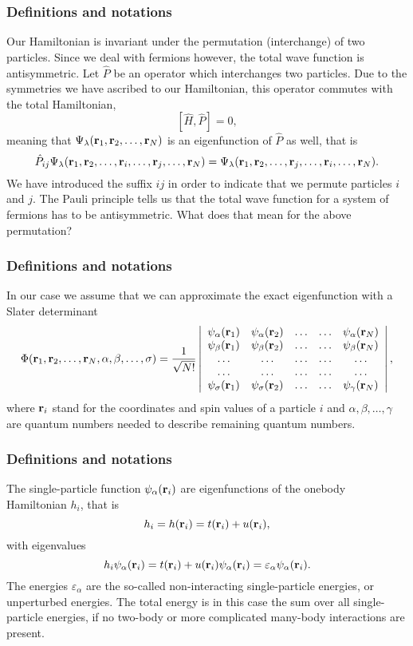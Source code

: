 \documentclass[compress]{beamer}
\newcommand{\be}{\begin{equation}}
\newcommand{\ee}{\end{equation}}
\newcommand{\be}{\begin{equation}}                        %
\newcommand{\ee}{\end{equation}}                          %
\begin{document}
\frame
{
  \frametitle{Definitions and notations}
\begin{small}
{\scriptsize
Our Hamiltonian is invariant under the permutation (interchange) of two particles. %
Since we deal with fermions however, the total wave function is antisymmetric.
Let $\hat{P}$ be an operator which interchanges two particles.
Due to the symmetries we have ascribed to our Hamiltonian, this operator commutes with the total Hamiltonian,
\[
[\hat{H},\hat{P}] = 0,
\]
meaning that $\Psi_{\lambda}({\bf r}_1, {\bf r}_2, \dots , {\bf r}_N)$ is an eigenfunction of 
$\hat{P}$ as well, that is
\[
\hat{P}_{ij}\Psi_{\lambda}({\bf r}_1, {\bf r}_2, \dots,{\bf r}_i,\dots,{\bf r}_j,\dots,{\bf r}_N)=
\Psi_{\lambda}({\bf r}_1, {\bf r}_2, \dots,{\bf r}_j,\dots,{\bf r}_i,\dots,{\bf r}_N).
\]
We have introduced the suffix $ij$ in order to indicate that we permute particles $i$ and $j$.
The Pauli principle tells us that the total wave function for a system of fermions
has to be antisymmetric. What does that mean for the above permutation?
}
\end{small}
}

\frame
{
  \frametitle{Definitions and notations}
\begin{small}
{\scriptsize
In our case we assume that  we can approximate the exact eigenfunction with a Slater determinant
\be
   \Phi({\bf r}_1, {\bf r}_2,\dots ,{\bf r}_N,\alpha,\beta,\dots, \sigma)=\frac{1}{\sqrt{N!}}
\left| \begin{array}{ccccc} \psi_{\alpha}({\bf r}_1)& \psi_{\alpha}({\bf r}_2)& \dots & \dots & \psi_{\alpha}({\bf r}_N)\\
                            \psi_{\beta}({\bf r}_1)&\psi_{\beta}({\bf r}_2)& \dots & \dots & \psi_{\beta}({\bf r}_N)\\  
                            \dots & \dots & \dots & \dots & \dots \\
                            \dots & \dots & \dots & \dots & \dots \\
                     \psi_{\sigma}({\bf r}_1)&\psi_{\sigma}({\bf r}_2)& \dots & \dots & \psi_{\gamma}({\bf r}_N)\end{array} \right|, 
\label{HartreeFockDet}
\ee 
where  ${\bf r}_i$  stand for the coordinates and spin values of a particle  $i$ and $\alpha,\beta,\dots, \gamma$ 
are quantum numbers needed to describe remaining quantum numbers.  
}
\end{small}
}

\frame
{
  \frametitle{Definitions and notations}
\begin{small}
{\scriptsize
The single-particle  function $\psi_{\alpha}({\bf r}_i)$  are eigenfunctions of the onebody
Hamiltonian $h_i$, that is
\[
h_i=h({\bf r}_i)=t({\bf r}_i) + u({\bf r}_i),
\]
with eigenvalues 
\[
 h_i\psi_{\alpha}({\bf r}_i)=t({\bf r}_i) + u({\bf r}_i)\psi_{\alpha}({\bf r}_i)=\varepsilon_{\alpha}\psi_{\alpha}({\bf r}_i).
\]
The energies $\varepsilon_{\alpha}$ are the so-called non-interacting single-particle  energies, or unperturbed energies. 
The total energy is in this case the sum over all  single-particle  energies, if no two-body or more complicated
many-body interactions are present.
}
\end{small}
}
\end{document}
